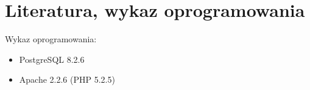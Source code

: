 \section{Literatura, wykaz oprogramowania}
Wykaz oprogramowania:
\begin{itemize}
    \item PostgreSQL 8.2.6
    \item Apache 2.2.6  (PHP 5.2.5)
\end{itemize}
